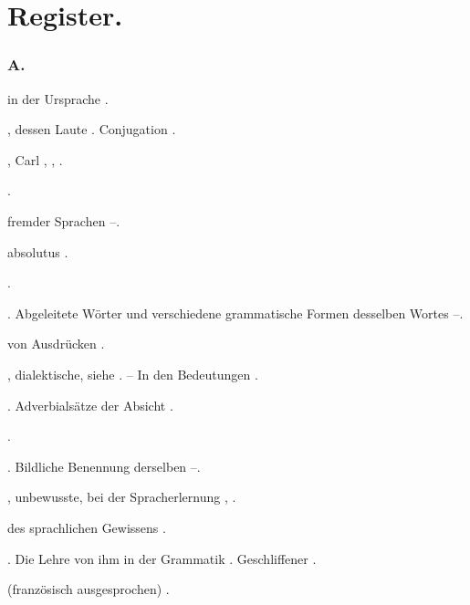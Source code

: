 \chapter*{Register.}\label{Register}
 
\begin{register}
\subsection*{A.}\label{reg.A}

 in der  Ursprache \pageref{sp.188}.

, dessen Laute \pageref{sp.34}. Conjugation \pageref{sp.423}.

, Carl \sed{\pageref{sp.229}}, \pageref{sp.244}, \pageref{sp.380}.

 \pageref{sp.245}.

 fremder Sprachen \pageref{sp.68}–\pageref{sp.69}.


 absolutus \pageref{sp.467}.

 \pageref{sp.200}.

. Abgeleitete Wörter und verschiedene grammatische Formen desselben Wortes \pageref{sp.121}–\pageref{sp.122}.

 von Ausdrücken \pageref{sp.45}.

, dialektische, siehe . – In den Bedeutungen \pageref{sp.100}.

. Adverbialsätze der Absicht \pageref{sp.104}.

 \pageref{sp.322}.

. Bildliche Benennung derselben \pageref{sp.42}–\pageref{sp.43}.

, unbewusste, bei der Spracherlernung \pageref{sp.63}, \sed{\pageref{sp.210}}.

 des sprachlichen Gewissens \pageref{sp.276}.

. Die Lehre von ihm in der Grammatik \pageref{sp.87}.  Geschliffener \pageref{sp.200}.

 (französisch ausgesprochen) \pageref{sp.34}.


\end{register}
